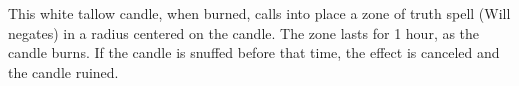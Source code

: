 {\begin{comment}
Moderate transmutation; CL 9th; Craft Wondrous Item, overland flight, permanency; Price 17,000 gp;Weight 3 lb.

Candle of Invocation:} Each of these special tapers is dedicated to one of the nine alignments. Simply burning the candle generates a favorable aura for the individual so doing if the candle's alignment matches that of the character. Characters of the same alignment as the burning candle add a \plus2 morale bonus on attack rolls, saving throws, and skill checks while within 30 feet of the flame.

A cleric whose alignment matches the candle's operates as if two levels higher for purposes of determining spells per day if he burns the candle during or just prior to his spell preparation time. He can even cast spells normally unavailable to him, as if he were of that higher level, but only so long as the candle continues to burn. Except in special cases (see below), a candle burns for 4 hours.

In addition, burning a candle also allows the owner to cast a gate spell, the respondent being of the same alignment as the candle, but the taper is immediately consumed in the process. It is possible to extinguish the candle simply by blowing it out, so users often place it in a lantern to protect it from drafts and the like. Doing this doesn't interfere with its magical properties.

Strong conjuration; CL 17th; Craft Wondrous Item, gate, creator must be same alignment as candle created; Price 8,400 gp;Weight 1/2 lb.
\end{comment}

 This white tallow candle, when burned, calls into place a zone of truth spell (Will negates) in a  radius centered on the candle. The zone lasts for 1 hour, as the candle burns. If the candle is snuffed before that time, the effect is canceled and the candle ruined.


\begin{comment}
Carpet of Flying:} This rug is able to fly through the air as if affected by an overland flight spell of unlimited duration. The size, carrying capacity, and speed of the different carpets of flying are shown on the table below. Beautifully and intricately made, each carpet has its own command word to activate it - if the device is within voice range, the command word activates it, whether the speaker is on the rug or not. The carpet is then controlled by spoken directions.


\end{comment}}
